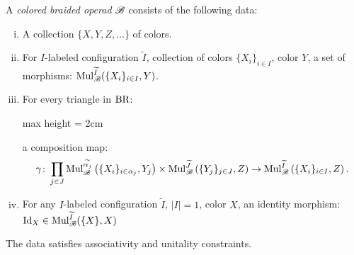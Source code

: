 \begin{frame}[fragile]
\tiny{\begin{defin}A {\em colored braided operad} $\mathscr{B}$ consists of the following
    data:
    \begin{enumerate}[(i)]
        \item A collection $\{X,Y,Z, \dots\}$ of colors.
        \item For $I$-labeled configuration $\widetilde{I}$,
         collection of
        colors $\{X_i\}_{i \in I}$, color $Y$, 
        a set of
        morphisms:
        $\operatorname{Mul}_{\mathscr{B}}^{\widetilde{I}}(\{X_i\}_{i \in I}, Y)$.
        \item For every triangle in $\operatorname{BR}$:
        \begin{center}
            \begin{adjustbox}{max height = 2cm}
        \end{adjustbox}
        \end{center}
        a composition map:
        \[
            \gamma \colon \prod_{j \in J} \operatorname{Mul}_{\mathscr{B}}^{\widetilde{\alpha_j}}\left(\{X_i\}_{i \in \alpha_j}, Y_j\right) \times \operatorname{Mul}_{\mathscr{B}}^{\widetilde{J}}\left(\{Y_j\}_{j\in J}, Z\right) \to \operatorname{Mul}_{\mathscr{B}}^{\widetilde{I}}\left(\{X_i\}_{i \in I}, Z\right).  
        \]
        \item For any $I$-labeled configuration $\widetilde{I}$, $|I|=1$, color
        $X$, an identity morphism: $\operatorname{Id}_X \in
        \operatorname{Mul}_{\mathscr{B}}^{\widetilde{I}}(\{X\}, X)$
        \end{enumerate}
        The data satisfies associativity and unitality constraints. \end{defin}}
\end{frame}

